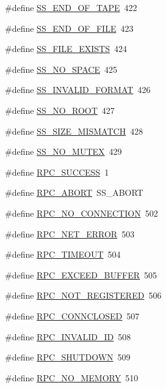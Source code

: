 \begin{DoxyCompactItemize}
\item 
\#define \hyperlink{group__err24_ga91cc51ebf0822e08c4935a2c09a1a60c}{SS\_\-END\_\-OF\_\-TAPE}~422
\item 
\#define \hyperlink{group__err24_ga040a5d277934aea616a26f523711a803}{SS\_\-END\_\-OF\_\-FILE}~423
\item 
\#define \hyperlink{group__err24_ga252be9bba4cc9d08025559dc495aca6b}{SS\_\-FILE\_\-EXISTS}~424
\item 
\#define \hyperlink{group__err24_gafe95d7246d004e42c34c3ede15d44648}{SS\_\-NO\_\-SPACE}~425
\item 
\#define \hyperlink{group__err24_gaa473d6d45ff06e93dcab855be5170ab1}{SS\_\-INVALID\_\-FORMAT}~426
\item 
\#define \hyperlink{group__err24_gabda878278e2d9236d3b18c1711c4df86}{SS\_\-NO\_\-ROOT}~427
\item 
\#define \hyperlink{group__err24_ga5fb7e0f4f8012a34514c319989e50143}{SS\_\-SIZE\_\-MISMATCH}~428
\item 
\#define \hyperlink{group__err24_ga12b0dd329283f2b865476ce4d3e1fcb3}{SS\_\-NO\_\-MUTEX}~429
\item 
\#define \hyperlink{group__err25_ga19b06966ce058cda8e5dca8d682b2bd3}{RPC\_\-SUCCESS}~1
\item 
\#define \hyperlink{group__err25_ga2a163d317723a6d3ac14627503f6ca7a}{RPC\_\-ABORT}~SS\_\-ABORT
\item 
\#define \hyperlink{group__err25_gad3a9f2a6b26ce5b987f6b2088fbb627c}{RPC\_\-NO\_\-CONNECTION}~502
\item 
\#define \hyperlink{group__err25_gae7db91aa77eeed4371ba30dfc122ded6}{RPC\_\-NET\_\-ERROR}~503
\item 
\#define \hyperlink{group__err25_gad29d62bce98ff8494be9337cb1a0a1f1}{RPC\_\-TIMEOUT}~504
\item 
\#define \hyperlink{group__err25_ga1a35d5e05d16d9040eaad41c4434a20a}{RPC\_\-EXCEED\_\-BUFFER}~505
\item 
\#define \hyperlink{group__err25_ga8e46f3de256d0dc247efd6386b5b5a39}{RPC\_\-NOT\_\-REGISTERED}~506
\item 
\#define \hyperlink{group__err25_ga50c5b6ef0ae99ed578f9209fdd961ac1}{RPC\_\-CONNCLOSED}~507
\item 
\#define \hyperlink{group__err25_ga3cbff68ac5b5d52f692b8e880f9ef76c}{RPC\_\-INVALID\_\-ID}~508
\item 
\#define \hyperlink{group__err25_ga0406ee07e8c5afbf8e46cb0eed698bcd}{RPC\_\-SHUTDOWN}~509
\item 
\#define \hyperlink{group__err25_ga810bf4af4a5d29b1d1d1423e8889b35f}{RPC\_\-NO\_\-MEMORY}~510

\end{DoxyCompactItemize}
